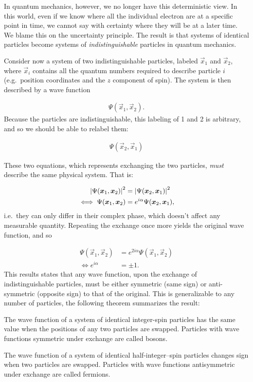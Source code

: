 \documentclass[Thesis.tex]{subfiles}
\begin{document}
In quantum mechanics, however, we no longer have this deterministic view. In
this world, even if we know where all the individual electron are at a specific
point in time, we cannot say with certainty where they will be at a later
time. We blame this on the uncertainty principle. The result is that systems of
identical particles become systems of \emph{indistinguishable} particles in
quantum mechanics.

Consider now a system of two indistinguishable particles, labeled $\vec x_1$ and
$\vec x_2$, where $\vec x_i$ contains all the quantum numbers required to describe
particle $i$ (e.g.\ position coordinates and the $z$ component of spin). The
system is then described by a wave function

\begin{align}
    \Psi(\vec x_1, \vec x_2).
\end{align}
Because the particles are indistinguishable, this labeling of 1 and 2 is
arbitrary, and so we should be able to relabel them:

\begin{align}
    \Psi(\vec x_2, \vec x_1)
\end{align}

These two equations, which represents exchanging the two particles, \emph{must}
describe the same physical system. That is:

\begin{align}
    \abs{\Psi(\bm{x}_1, \bm{x}_2)}^2 &= \abs{\Psi(\bm{x}_2, \bm{x}_1)}^2\\
    \iff \Psi(\bm{x}_1,\bm{x}_2) &= e^{i\alpha}\Psi(\bm{x}_2, \bm{x}_1),
\end{align}
i.e.\ they can only differ in their complex phase, which doesn't affect any measurable
quantity. Repeating the exchange once more yields the original wave function, and so

\begin{align}
    \Psi(\vec x_1,\vec x_2) &= e^{2i\alpha}\Psi(\vec x_1, \vec x_2)\\
    \iff e^{i\alpha} &= \pm 1.
\end{align}
This results states that any wave function, upon the exchange of
indistinguishable particles, must be either symmetric (same sign) or
anti-symmetric (opposite sign) to that of the original. This is generalizable to
any number of particles, the following theorem summarizes the result:

\begin{theorem}\label{theorem:spin-statistic}

    The wave function of a system of identical integer-spin particles has the same value
    when the positions of any two particles are swapped. Particles with wave functions
    symmetric under exchange are called bosons.

    The wave function of a system of identical half-integer–spin particles changes sign
    when two particles are swapped. Particles with wave functions antisymmetric under
    exchange are called fermions.
\end{theorem}
\end{document}
